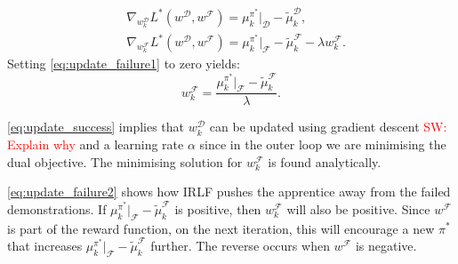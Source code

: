 \documentclass[letterpaper]{article}
\newcommand{\sw}[1]{\textcolor{red}{SW: #1}}
\newcommand{\ks}[1]{\textcolor{green}{Kyriacos: #1}}
\newcommand{\sw}[1]{}
\newcommand{\ks}[1]{}
\begin{document}
\begin{align}
	&\nabla_{w^{\mathcal{D}}_k}L^*(w^{\mathcal{D}},w^{\mathcal{F}}) = \mu^{\pi^*}_ k|_{\mathcal{D}}- \widetilde{\mu}^{\mathcal{D}}_k \label{eq:update_success},\\
		&\nabla_{w^{\mathcal{F}}_k}L^*(w^{\mathcal{D}},w^{\mathcal{F}}) = \mu^{\pi^*}_k|_{\mathcal{F}} - \widetilde{\mu}^{\mathcal{F}}_k - \lambda w^{\mathcal{F}}_k. \label{eq:update_failure1}
\end{align}
Setting \eqref{eq:update_failure1} to zero yields:
\begin{equation}
  \label{eq:update_failure2}
  w^{\mathcal{F}}_k = \frac{\mu^{\pi^*}_k|_{\mathcal{F}} - \widetilde{\mu}^{\mathcal{F}}_k}{\lambda}.
\end{equation}
%

\noindent \eqref{eq:update_success} implies that $w^{\mathcal{D}}_k$ can be updated using gradient descent \sw{Explain why} and a learning rate $\alpha$ since in the outer loop we are minimising the dual objective. %
The minimising solution for $w^{\mathcal{F}}_k$ is found analytically.

\eqref{eq:update_failure2} shows how IRLF pushes the apprentice away from the failed demonstrations.  If $\mu^{\pi^*}_k|_{\mathcal{F}} - \widetilde{\mu}^{\mathcal{F}}_k$ is positive, then $w^{\mathcal{F}}_k$ will also be positive.  Since $w^{\mathcal{F}}$ is part of the reward function, on the next iteration, this will encourage a new $\pi^*$ that increases $\mu^{\pi^*}_k|_{\mathcal{F}} - \widetilde{\mu}^{\mathcal{F}}_k$ further.  The reverse occurs when $w^{\mathcal{F}}$ is negative.
\end{document}
